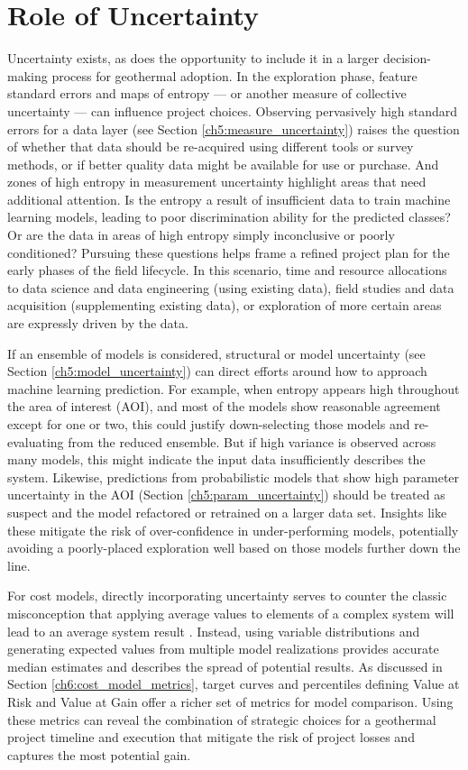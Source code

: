 \section{Role of Uncertainty}
\label{ch7:uncertainty_role}

Uncertainty exists, as does the opportunity to include it in a larger decision-making process for geothermal adoption. In the exploration phase, feature standard errors and maps of entropy --- or another measure of collective uncertainty --- can influence project choices. Observing pervasively high standard errors for a data layer (see Section \ref{ch5:measure_uncertainty}) raises the question of whether that data should be re-acquired using different tools or survey methods, or if better quality data might be available for use or purchase. And zones of high entropy in measurement uncertainty highlight areas that need additional attention. Is the entropy a result of insufficient data to train machine learning models, leading to poor discrimination ability for the predicted classes? Or are the data in areas of high entropy simply inconclusive or poorly conditioned? Pursuing these questions helps frame a refined project plan for the early phases of the field lifecycle. In this scenario, time and resource allocations to data science and data engineering (using existing data), field studies and data acquisition (supplementing existing data), or exploration of more certain areas are expressly driven by the data.

If an ensemble of models is considered, structural or model uncertainty (see Section \ref{ch5:model_uncertainty}) can direct efforts around how to approach machine learning prediction. For example, when entropy appears high throughout the area of interest (AOI), and most of the models show reasonable agreement except for one or two, this could justify down-selecting those models and re-evaluating from the reduced ensemble. But if high variance is observed across many models, this might indicate the input data insufficiently describes the system. Likewise, predictions from probabilistic models that show high parameter uncertainty in the AOI (Section \ref{ch5:param_uncertainty}) should be treated as suspect and the model refactored or retrained on a larger data set. Insights like these mitigate the risk of over-confidence in under-performing models, potentially avoiding a poorly-placed exploration well based on those models further down the line.

For cost models, directly incorporating uncertainty serves to counter the classic misconception that applying average values to elements of a complex system will lead to an average system result \citep[Flaw of Averages,][p.\ 17-19]{de_neufville_flexibility_2011}. Instead, using variable distributions and generating expected values from multiple model realizations provides accurate median estimates and describes the spread of potential results. As discussed in Section \ref{ch6:cost_model_metrics}, target curves and percentiles defining Value at Risk and Value at Gain offer a richer set of metrics for model comparison. Using these metrics can reveal the combination of strategic choices for a geothermal project timeline and execution that mitigate the risk of project losses and captures the most potential gain.

